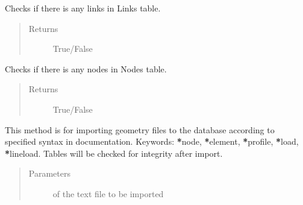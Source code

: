 \documentclass[letterpaper,10pt,english]{sphinxmanual}
\begin{document}
\begin{fulllineitems}
\begin{fulllineitems}
\begin{quote}
\begin{description}
\end{description}\end{quote}

\end{fulllineitems}


\begin{fulllineitems}
\label{\detokenize{api:beamon.database.Database.has_links}}
Checks if there is any links in Links table.
\begin{quote}\begin{description}
\item[{Returns}] \leavevmode
True/False

\end{description}\end{quote}

\end{fulllineitems}


\begin{fulllineitems}
\label{\detokenize{api:beamon.database.Database.has_nodes}}
Checks if there is any nodes in Nodes table.
\begin{quote}\begin{description}
\item[{Returns}] \leavevmode
True/False

\end{description}\end{quote}

\end{fulllineitems}


\begin{fulllineitems}
\label{\detokenize{api:beamon.database.Database.import_text}}
This method is for importing geometry files to the database according to specified syntax in documentation.
Keywords: {\color{red}\bfseries{}*}node, {\color{red}\bfseries{}*}element, {\color{red}\bfseries{}*}profile, {\color{red}\bfseries{}*}load, {\color{red}\bfseries{}*}lineload.
Tables will be checked for integrity after import.
\begin{quote}\begin{description}
\item[{Parameters}] \leavevmode
{} \textendash{} of the text file to be imported


\end{description}
\end{quote}
\end{fulllineitems}
\end{fulllineitems}
\end{document}
